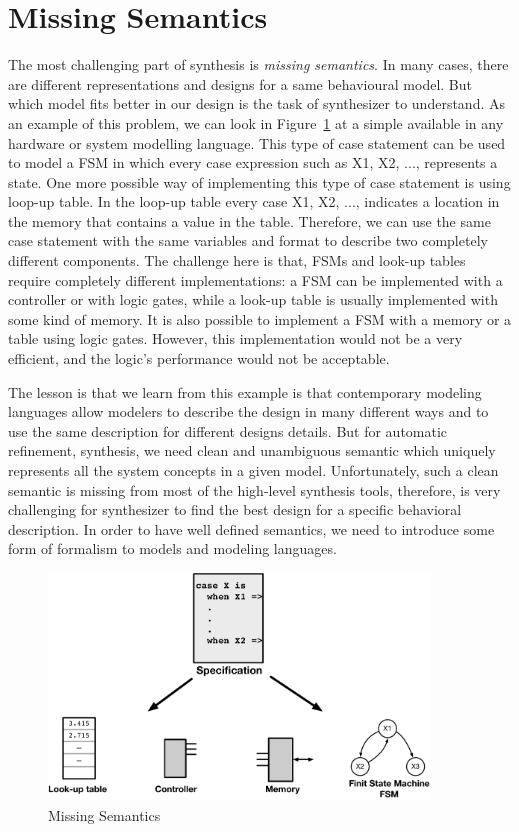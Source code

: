 \section{Missing Semantics}
\label{sec:missing_semantics}

The most challenging part of synthesis is \emph{missing semantics}.
In many cases, there are different representations and designs for a same behavioural model. 
But which model fits better in our design is the task of synthesizer to understand. 
As an example of this problem, we can look in Figure~\ref{fig:missing_semantics} at a simple  available in any hardware or system modelling language.
This type of case statement can be used to model a FSM in which every case expression such as X1, X2, ..., represents a state.
One more possible way of implementing this type of case statement is using loop-up table.
In the loop-up table every case X1, X2, ..., indicates a location in the memory that contains a value in the table.
Therefore,  we can use the same case statement with the same variables and format to describe two completely different components.
The challenge here is that, FSMs and look-up tables require completely different implementations:  a FSM can be implemented with a controller or with logic gates, while a look-up table is usually implemented with some kind of memory.
It is also possible to implement a FSM with a memory or a table using logic gates.
However, this implementation would not be a very efficient, and the logic's performance would not be acceptable.

The lesson is that we learn from this example is that contemporary modeling languages allow modelers to describe the design in many different ways and to use the same description for different designs details. But for automatic refinement, synthesis, we need clean and unambiguous semantic which uniquely represents all the system concepts in a given model.
Unfortunately, such a clean semantic is missing from most of the high-level synthesis tools, therefore, is very challenging for synthesizer to find the best design for a specific behavioral description.
In order to have well defined semantics, we need to introduce some form of formalism to models and modeling languages.


\begin{figure}[h]
    \centering
    \includegraphics[width=0.9\textwidth]{figures/Introduction/Missing_Semantics.pdf}
    \caption{Missing Semantics}
    \label{fig:missing_semantics}
\end{figure}


